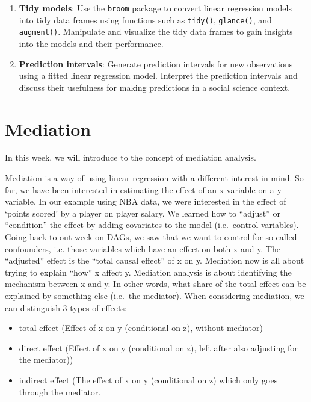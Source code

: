 \documentclass[
]{book}
\providecommand{\tightlist}{%
  \setlength{\itemsep}{0pt}\setlength{\parskip}{0pt}}
\begin{document}
\begin{enumerate}
\item
  \textbf{Tidy models}: Use the \texttt{broom} package to convert linear regression models into tidy data frames using functions such as \texttt{tidy()}, \texttt{glance()}, and \texttt{augment()}. Manipulate and visualize the tidy data frames to gain insights into the models and their performance.
\item
  \textbf{Prediction intervals}: Generate prediction intervals for new observations using a fitted linear regression model. Interpret the prediction intervals and discuss their usefulness for making predictions in a social science context.
\end{enumerate}

\hypertarget{med}{%
\chapter{Mediation}\label{med}}

In this week, we will introduce to the concept of mediation analysis.

Mediation is a way of using linear regression with a different interest in mind.
So far, we have been interested in estimating the effect of an x variable on a
y variable. In our example using NBA data, we were interested in the effect of
`points scored' by a player on player salary. We learned how to ``adjust'' or ``condition''
the effect by adding covariates to the model (i.e.~control variables). Going back to
out week on DAGs, we saw that we want to control for so-called confounders, i.e.
those variables which have an effect on both x and y. The ``adjusted'' effect is the
``total causal effect'' of x on y.
Mediation now is all about trying to explain ``how'' x affect y. Mediation analysis
is about identifying the mechanism between x and y. In other words, what share
of the total effect can be explained by something else (i.e.~the mediator). When
considering mediation, we can distinguish 3 types of effects:

\begin{itemize}
\tightlist
\item
  total effect (Effect of x on y (conditional on z), without mediator)
\item
  direct effect (Effect of x on y (conditional on z), left after also adjusting for the mediator))
\item
  indirect effect (The effect of x on y (conditional on z) which only goes through the mediator.
\end{itemize}
\end{document}
